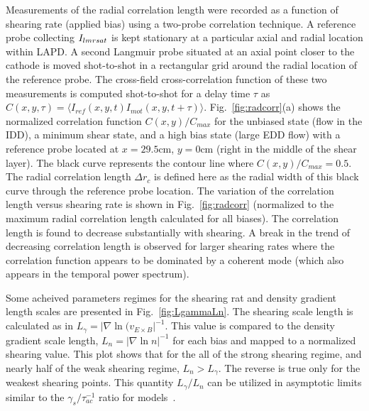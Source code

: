 \documentclass[aip,pop,amsmath,amssymb,preprint,superscriptaddress]{revtex4-1} %
\begin{document}
Measurements of the radial correlation length were recorded as a function of shearing rate (applied bias) using a two-probe correlation technique. A reference probe collecting $I_{\rmdefault sat}$ is kept stationary at a particular axial and radial location within LAPD. A second Langmuir probe situated at an axial point closer to the cathode is moved shot-to-shot in a rectangular grid around the radial location of the reference probe.  The cross-field cross-correlation function of these two measurements is computed shot-to-shot for a delay time $\tau$ as $C(x,y,\tau) = \langle I_{ref}(x,y,t)I_{mot}(x,y,t+\tau)\rangle$.
%
%
%
Fig.~\ref{fig:radcorr}(a) shows the normalized correlation function $C(x,y)/C_{max}$ for the unbiased state (flow in the IDD), a minimum shear state, and a high bias state (large EDD flow) with a reference probe located at $x=29.5$cm, $y=0$cm (right in the middle of the shear layer). The black curve represents the contour line where $C(x,y)/C_{max} = 0.5$. The radial correlation length $\Delta r_{c}$ is defined here as the radial width of this black curve through the reference probe location.   The variation of the correlation length versus shearing rate is shown in Fig.~\ref{fig:radcorr} (normalized to the maximum radial correlation length calculated for all biases).
The correlation length is found to decrease substantially with shearing.  A break in the trend of decreasing correlation length is observed for larger shearing rates where the correlation function appears to be dominated by a coherent mode (which also appears in the temporal power spectrum).

Some acheived parameters regimes for the shearing rat and density gradient length scales are presented in Fig.~\ref{fig:LgammaLn}. The shearing scale length is calculated as in $L_{\gamma} = |\nabla \ln(v_{E\times B}|^{-1}.$ This value is compared to the density gradient scale length, $L_{n} = |\nabla \ln{n}|^{-1}$ for each bias and mapped to a normalized shearing value. This plot shows that for the all of the strong shearing regime, and nearly half of the weak shearing regime, $L_{n} > L_{\gamma}$. The reverse is true only for the weakest shearing points. This quantity $L_{\gamma}/L_{n}$ can be utilized in asymptotic limits similar to the $\gamma_{s}/\tau_{ac}^{-1}$ ratio for models~\cite{leconte06}.
\end{document}
